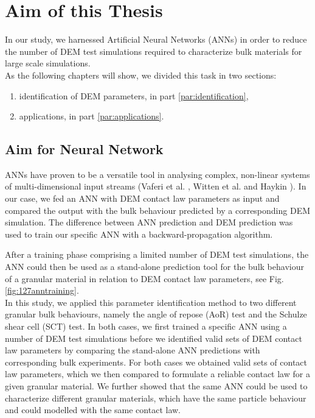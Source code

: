 
\chapter{Aim of this Thesis}
\label{cap:aim}

In our study, we harnessed Artificial Neural Networks (\acs{ANNs}) in order to
reduce the number of \acs{DEM} test simulations required
to characterize bulk materials for large scale simulations. \\
As the following chapters will show, we divided this task in two sections:
\begin{enumerate}
  \item{identification of \acs{DEM} parameters, in part
  \ref{par:identification},}
  \item{applications, in part \ref{par:applications}.}
\end{enumerate}


\section{Aim for Neural Network}
\label{sec:aimforneuralnetwork}

\acs{ANNs} have proven to be a versatile tool in analysing complex, non-linear
systems of multi-dimensional input streams (Vaferi et al. \cite{RefWorks:150}, Witten et
al. \cite{RefWorks:174} and Haykin \cite{RefWorks:158}).
In our case, we fed an \acs{ANN} with \acs{DEM} contact law parameters as input
and compared the output with the bulk behaviour 
predicted by a corresponding \acs{DEM} simulation. 
The difference between \acs{ANN} prediction and \acs{DEM} prediction was used to
train our specific \acs{ANN} with a backward-propagation algorithm. 

After a training phase comprising a limited number of \acs{DEM} test simulations,
the \acs{ANN} could then be used as a stand-alone prediction tool for the bulk behaviour of a 
granular material in relation to \acs{DEM} contact law parameters, see Fig.
\ref{fig:127anntraining}. \\
In this study, we applied this parameter identification method to two different
granular bulk behaviours, namely the angle of repose (\acs{AoR}) test and the
Schulze shear cell (\acs{SCT}) test.
In both cases, we first trained a specific \acs{ANN} using a number of \acs{DEM} test
simulations before we identified valid sets of \acs{DEM} contact law parameters by
comparing the stand-alone \acs{ANN} predictions with corresponding bulk experiments. 
For both cases we obtained valid sets of contact law parameters, 
which we then compared to formulate a reliable contact law for a given
granular material.
We further showed that the same \acs{ANN} could be used to characterize different
granular materials, which have the same particle behaviour and could modelled with the same contact
law.

